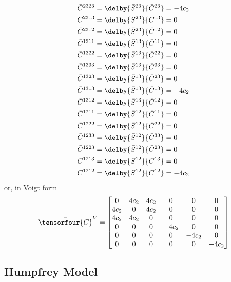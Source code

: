 \begin{equation}
\begin{split}
    \bar{C}^{2323}&=\delby{\bar{S}^{23}}{\bar{C}^{23}}=-4c_{2}\\
    \bar{C}^{2313}&=\delby{\bar{S}^{23}}{\bar{C}^{13}}=0\\
    \bar{C}^{2312}&=\delby{\bar{S}^{23}}{\bar{C}^{12}}=0\\
    \bar{C}^{1311}&=\delby{\bar{S}^{13}}{\bar{C}^{11}}=0\\
    \bar{C}^{1322}&=\delby{\bar{S}^{13}}{\bar{C}^{22}}=0\\
    \bar{C}^{1333}&=\delby{\bar{S}^{13}}{\bar{C}^{33}}=0\\
    \bar{C}^{1323}&=\delby{\bar{S}^{13}}{\bar{C}^{23}}=0\\
    \bar{C}^{1313}&=\delby{\bar{S}^{13}}{\bar{C}^{13}}=-4c_{2}\\
    \bar{C}^{1312}&=\delby{\bar{S}^{13}}{\bar{C}^{12}}=0\\
    \bar{C}^{1211}&=\delby{\bar{S}^{12}}{\bar{C}^{11}}=0\\
    \bar{C}^{1222}&=\delby{\bar{S}^{12}}{\bar{C}^{22}}=0\\
    \bar{C}^{1233}&=\delby{\bar{S}^{12}}{\bar{C}^{33}}=0\\
    \bar{C}^{1223}&=\delby{\bar{S}^{12}}{\bar{C}^{23}}=0\\
    \bar{C}^{1213}&=\delby{\bar{S}^{12}}{\bar{C}^{13}}=0\\
    \bar{C}^{1212}&=\delby{\bar{S}^{12}}{\bar{C}^{12}}=-4c_{2}\\
  \end{split}
\end{equation}
or, in Voigt form
\begin{equation}
  \bar{\tensorfour{C}}^{V}=\begin{bmatrix}
  0 & 4c_{2} & 4c_{2} & 0 & 0 & 0 \\
  4c_{2} & 0 & 4c_{2} & 0 & 0 & 0 \\
  4c_{2} & 4c_{2} & 0 & 0 & 0 & 0 \\
  0     & 0      & 0 & -4c_{2} & 0 & 0 \\
  0     & 0      & 0 & 0      & -4c_{2} & 0 \\
  0     & 0      & 0 & 0      & 0      & -4c_{2} 
  \end{bmatrix}
\end{equation}

\subsection{Humpfrey Model}

